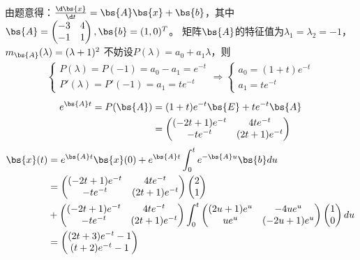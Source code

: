 \documentclass[12pt, a4paper, oneside, UTF8]{ctexbook}
\begin{document}
\begin{solution}
    由题意得：$\frac{\d \bs{x}}{\d t}=\bs{A}\bs{x}+\bs{b}$，其中$\bs{A}=\begin{pmatrix}
        -3&4\\
        -1&1
    \end{pmatrix},\bs{b}=(1,0)^T$。
    矩阵$\bs{A}$的特征值为$\lambda_1=\lambda_2=-1$，$m_{\bs{A}}(\lambda)=(\lambda+1)^2$
    不妨设$P(\lambda)=a_0+a_1\lambda$，则 \begin{align*}
        \left\{
            \begin{array}{ll}
                P(\lambda)=P(-1)=a_0-a_1=e^{-t}\\
                P'(\lambda)=P'(-1)=a_1=te^{-t}
            \end{array}
            \right.
        \Rightarrow
        \left\{
            \begin{array}{ll}
                a_0=(1+t)e^{-t}\\
                a_1=te^{-t}
            \end{array}
            \right.
    \end{align*}
    \begin{align*}
        e^{\bs{A}t}=P(\bs{A})
    &=(1+t)e^{-t}\bs{E}+te^{-t}\bs{A}\\
    &=\begin{pmatrix}
        (-2t+1)e^{-t} &4te^{-t} \\
        -te^{-t}  & (2t+1)e^{-t}
    \end{pmatrix}
    \end{align*}
    \begin{align*}
        \bs{x}(t)&=e^{\bs{A}t}\bs{x}(0)+e^{\bs{A}t}\int_{0}^t e^{-\bs{A}u}\bs{b} du\\
        &=\begin{pmatrix}
            (-2t+1)e^{-t} &4te^{-t} \\
        -te^{-t}  & (2t+1)e^{-t}
        \end{pmatrix}\begin{pmatrix}
            2 \\
            1
        \end{pmatrix}\\
        &+\begin{pmatrix}
            (-2t+1)e^{-t} &4te^{-t} \\
        -te^{-t}  & (2t+1)e^{-t}
        \end{pmatrix}\int_{0}^t 
        \begin{pmatrix}
            (2u+1)e^{u} &-4ue^{u} \\
            ue^{u}  & (-2u+1)e^{u}
        \end{pmatrix} \begin{pmatrix}
            1\\
            0
        \end{pmatrix} du \\
        &=\begin{pmatrix}
            (2t+3)e^{-t}-1\\
            (t+2)e^{-t}-1
        \end{pmatrix}
        \end{align*}
\end{solution}
\end{document}
